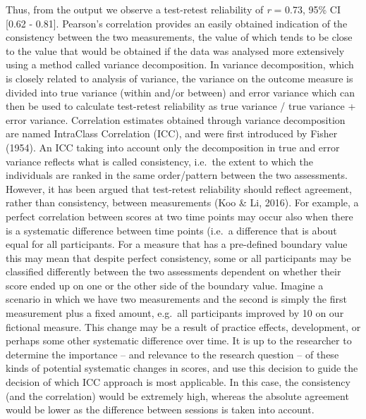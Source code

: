 \documentclass[english,,man,floatsintext]{apa6}
\begin{document}
Thus, from the output we observe a test-retest reliability of \emph{r} = 0.73, 95\% CI {[}0.62 - 0.81{]}. Pearson's correlation provides an easily obtained indication of the consistency between the two measurements, the value of which tends to be close to the value that would be obtained if the data was analysed more extensively using a method called variance decomposition. In variance decomposition, which is closely related to analysis of variance, the variance on the outcome measure is divided into true variance (within and/or between) and error variance which can then be used to calculate test-retest reliability as true variance / true variance + error variance. Correlation estimates obtained through variance decomposition are named IntraClass Correlation (ICC), and were first introduced by Fisher (1954). An ICC taking into account only the decomposition in true and error variance reflects what is called consistency, i.e.~the extent to which the individuals are ranked in the same order/pattern between the two assessments. However, it has been argued that test-retest reliability should reflect agreement, rather than consistency, between measurements (Koo \& Li, 2016). For example, a perfect correlation between scores at two time points may occur also when there is a systematic difference between time points (i.e.~a difference that is about equal for all participants. For a measure that has a pre-defined boundary value this may mean that despite perfect consistency, some or all participants may be classified differently between the two assessments dependent on whether their score ended up on one or the other side of the boundary value. Imagine a scenario in which we have two measurements and the second is simply the first measurement plus a fixed amount, e.g.~all participants improved by 10 on our fictional measure. This change may be a result of practice effects, development, or perhaps some other systematic difference over time. It is up to the researcher to determine the importance -- and relevance to the research question -- of these kinds of potential systematic changes in scores, and use this decision to guide the decision of which ICC approach is most applicable. In this case, the consistency (and the correlation) would be extremely high, whereas the absolute agreement would be lower as the difference between sessions is taken into account.
\end{document}
